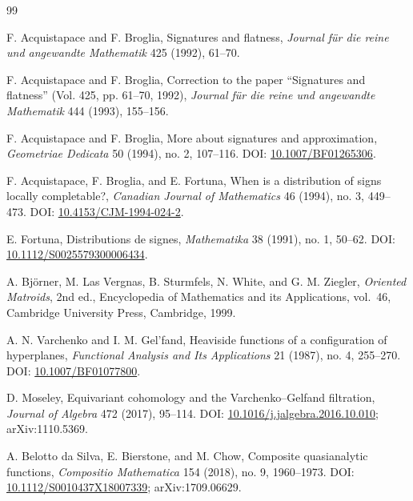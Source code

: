 \documentclass[11pt]{article}
\theoremstyle{definition}
\theoremstyle{remark}
\begin{document}
\begin{thebibliography}{99}
\small\raggedright

F. Acquistapace and F. Broglia,
\newblock Signatures and flatness,
\newblock \emph{Journal f\"ur die reine und angewandte Mathematik} 425 (1992), 61--70.

F. Acquistapace and F. Broglia,
\newblock Correction to the paper ``Signatures and flatness'' (Vol. 425, pp. 61--70, 1992),
\newblock \emph{Journal f\"ur die reine und angewandte Mathematik} 444 (1993), 155--156.

F. Acquistapace and F. Broglia,
\newblock More about signatures and approximation,
\newblock \emph{Geometriae Dedicata} 50 (1994), no. 2, 107--116.
\newblock DOI: \href{https://doi.org/10.1007/BF01265306}{10.1007/BF01265306}.

F. Acquistapace, F. Broglia, and E. Fortuna,
\newblock When is a distribution of signs locally completable?,
\newblock \emph{Canadian Journal of Mathematics} 46 (1994), no. 3, 449--473.
\newblock DOI: \href{https://doi.org/10.4153/CJM-1994-024-2}{10.4153/CJM-1994-024-2}.

E. Fortuna,
\newblock Distributions de signes,
\newblock \emph{Mathematika} 38 (1991), no. 1, 50--62.
\newblock DOI: \href{https://doi.org/10.1112/S0025579300006434}{10.1112/S0025579300006434}.

A. Bj\"orner, M. Las Vergnas, B. Sturmfels, N. White, and G. M. Ziegler,
\newblock \emph{Oriented Matroids}, 2nd ed.,
\newblock Encyclopedia of Mathematics and its Applications, vol.~46, Cambridge University Press, Cambridge, 1999.

A. N. Varchenko and I. M. Gel'fand,
\newblock Heaviside functions of a configuration of hyperplanes,
\newblock \emph{Functional Analysis and Its Applications} 21 (1987), no. 4, 255--270.
\newblock DOI: \href{https://doi.org/10.1007/BF01077800}{10.1007/BF01077800}.

D. Moseley,
\newblock Equivariant cohomology and the Varchenko--Gelfand filtration,
\newblock \emph{Journal of Algebra} 472 (2017), 95--114.
\newblock DOI: \href{https://doi.org/10.1016/j.jalgebra.2016.10.010}{10.1016/j.jalgebra.2016.10.010}; arXiv:1110.5369.

A. Belotto da Silva, E. Bierstone, and M. Chow,
\newblock Composite quasianalytic functions,
\newblock \emph{Compositio Mathematica} 154 (2018), no. 9, 1960--1973.
\newblock DOI: \href{https://doi.org/10.1112/S0010437X18007339}{10.1112/S0010437X18007339}; arXiv:1709.06629.


\end{thebibliography}
\end{document}
